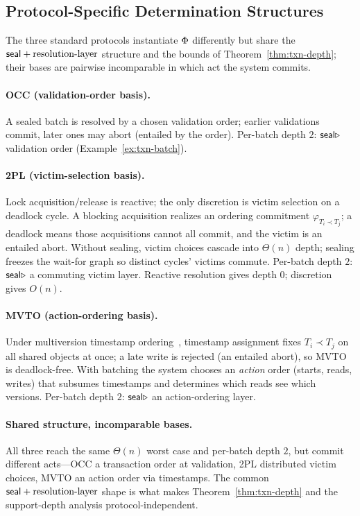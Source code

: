 \subsection{Protocol-Specific Determination Structures}
\label{sec:txn-protocols}

The three standard protocols instantiate $\Phi$ differently but share the
$\mathsf{seal} + \text{resolution-layer}$ structure and the bounds of
Theorem~\ref{thm:txn-depth}; their bases are pairwise incomparable in which act
the system commits.

\paragraph{OCC (validation-order basis).}
A sealed batch is resolved by a chosen validation order; earlier validations
commit, later ones may abort (entailed by the order). Per-batch depth $2$:
$\mathsf{seal} \mathbin{\triangleright}$ validation order (Example~\ref{ex:txn-batch}).

\paragraph{2PL (victim-selection basis).}
Lock acquisition/release is reactive; the only discretion is victim selection on
a deadlock cycle. A blocking acquisition realizes an ordering commitment
$\varphi_{T_i \prec T_j}$; a deadlock means those acquisitions cannot all
commit, and the victim is an entailed abort. Without sealing, victim choices
cascade into $\Theta(n)$ depth; sealing freezes the wait-for graph so distinct
cycles' victims commute. Per-batch depth $2$: $\mathsf{seal} \mathbin{\triangleright}$ a commuting victim
layer. Reactive resolution gives depth $0$; discretion gives $O(n)$.

\paragraph{MVTO (action-ordering basis).}
Under multiversion timestamp ordering~\cite{reed1978naming}, timestamp
assignment fixes $T_i \prec T_j$ on all shared objects at once; a late write is
rejected (an entailed abort), so MVTO is deadlock-free. With batching the system
chooses an \emph{action} order (starts, reads, writes) that subsumes timestamps
and determines which reads see which versions. Per-batch depth $2$:
$\mathsf{seal} \mathbin{\triangleright}$ an action-ordering layer.

\paragraph{Shared structure, incomparable bases.}
All three reach the same $\Theta(n)$ worst case and per-batch depth $2$, but
commit different acts---OCC a transaction order at validation, 2PL distributed
victim choices, MVTO an action order via timestamps. The common
$\mathsf{seal} + \text{resolution-layer}$ shape is what makes
Theorem~\ref{thm:txn-depth} and the support-depth analysis protocol-independent.
